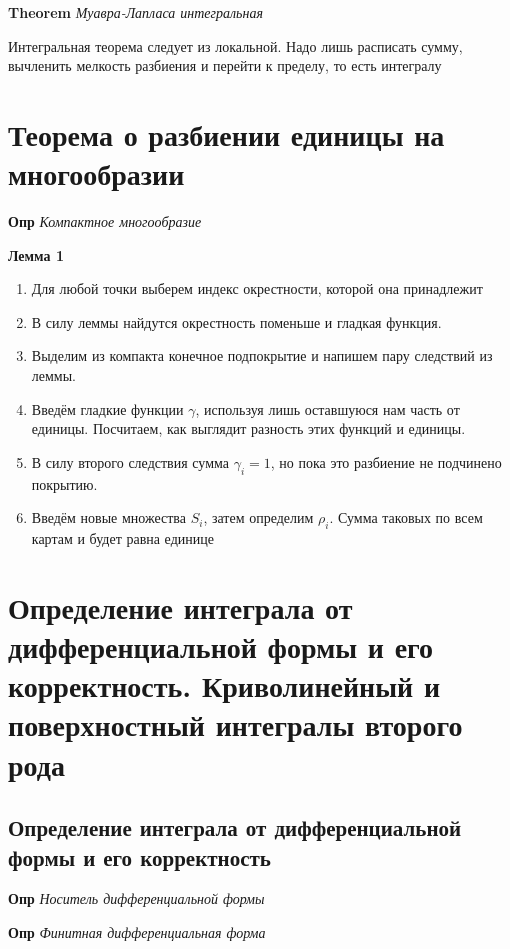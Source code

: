 \documentclass[a4paper, 14pt]{article}
\begin{document}
    \textbf{Theorem} \textit{Муавра-Лапласа интегральная}
    
    Интегральная теорема следует из локальной.
    Надо лишь расписать сумму, вычленить мелкость разбиения и перейти к пределу, то есть интегралу
    
    \section{Теорема о разбиении единицы на многообразии}
    
    \textbf{Опр} \textit{Компактное многообразие}
    
    \textbf{Лемма 1}
    
    \begin{enumerate}
        \item Для любой точки выберем индекс окрестности, которой она принадлежит
        \item В силу леммы найдутся окрестность поменьше и гладкая функция.
        \item Выделим из компакта конечное подпокрытие и напишем пару следствий из леммы.
        \item Введём гладкие функции $\gamma$, используя лишь оставшуюся нам часть от единицы.
        Посчитаем, как выглядит разность этих функций и единицы.
        \item В силу второго следствия сумма $\gamma_i = 1$, но пока это разбиение не подчинено покрытию.
        \item Введём новые множества $S_i$, затем определим $\rho_i$.
        Сумма таковых по всем картам и будет равна единице
    \end{enumerate}
    
    \section{Определение интеграла от дифференциальной формы и его корректность.
    Криволинейный и поверхностный интегралы второго рода}
    
    \subsection{Определение интеграла от дифференциальной формы и его корректность}
    
    \textbf{Опр} \textit{Носитель дифференциальной формы}
    
    \textbf{Опр} \textit{Финитная дифференциальная форма}
    
\end{document}
